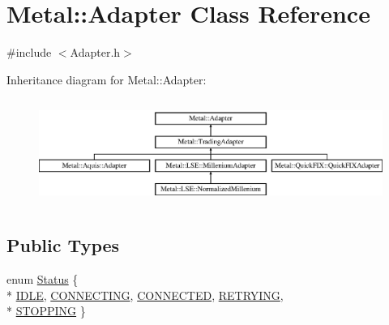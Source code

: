 \hypertarget{classMetal_1_1Adapter}{}\section{Metal\+:\+:Adapter Class Reference}
\label{classMetal_1_1Adapter}


{\ttfamily \#include $<$Adapter.\+h$>$}

Inheritance diagram for Metal\+:\+:Adapter\+:\begin{figure}[H]
\begin{center}
\leavevmode
\includegraphics[height=3.489097cm]{classMetal_1_1Adapter}
\end{center}
\end{figure}
\subsection*{Public Types}
\begin{DoxyCompactItemize}
\item 
enum \hyperlink{classMetal_1_1Adapter_a61c44194e1ca48fb73a122997c5c7f27}{Status} \{ \\*
\hyperlink{classMetal_1_1Adapter_a61c44194e1ca48fb73a122997c5c7f27ab5de0d70e12c0acd465fc7d54cc28721}{I\+D\+L\+E}, 
\hyperlink{classMetal_1_1Adapter_a61c44194e1ca48fb73a122997c5c7f27a20c2433a05eb7f50345bf628ab79220d}{C\+O\+N\+N\+E\+C\+T\+I\+N\+G}, 
\hyperlink{classMetal_1_1Adapter_a61c44194e1ca48fb73a122997c5c7f27a63b94ce825c3dacb5f4edab173a52fa6}{C\+O\+N\+N\+E\+C\+T\+E\+D}, 
\hyperlink{classMetal_1_1Adapter_a61c44194e1ca48fb73a122997c5c7f27a4a0ba8e6cbbf8dc448d212a63a6b0b0f}{R\+E\+T\+R\+Y\+I\+N\+G}, 
\\*
\hyperlink{classMetal_1_1Adapter_a61c44194e1ca48fb73a122997c5c7f27a046def181606c3f36a2e3d2363a6cf10}{S\+T\+O\+P\+P\+I\+N\+G}
 \}
\end{DoxyCompactItemize}
